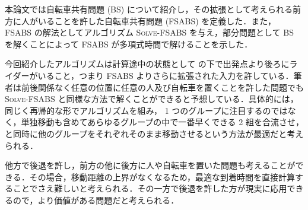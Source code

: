 本論文では自転車共有問題 (BS) について紹介し，その拡張として考えられる前方に人がいることを許した自転車共有問題 (FSABS) を定義した．また， FSABS の解法としてアルゴリズム \textsc{Solve-FSABS} を与え，部分問題として BS を解くことによって FSABS が多項式時間で解けることを示した．

今回紹介したアルゴリズムは計算途中の状態として  の下で出発点より後ろにライダーがいること，つまり FSABS よりさらに拡張された入力を許している．筆者は前後関係なく任意の位置に任意の人及び自転車を置くことを許した問題でも \textsc{Solve-FSABS} と同様な方法で解くことができると予想している．具体的には，同じく再帰的な形でアルゴリズムを組み， 1 つのグループに注目するのではなく，単独移動も含めてあらゆるグループの中で一番早くできる 2 組を合流させ，  と同時に他のグループをそれぞれそのまま移動させるという方法が最適だと考えられる．

他方で後退を許し，前方の他に後方に人や自転車を置いた問題も考えることができる．その場合，移動距離の上界がなくなるため，最適な到着時間を直接計算することでさえ難しいと考えられる．その一方で後退を許した方が現実に応用できるので，より価値がある問題だと考えられる．